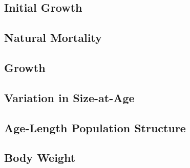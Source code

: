 \documentclass[11pt,
  english,
  letterpaper,
]{article}
\begin{document}
\hypertarget{initial-growth}{%
\subsection{Initial Growth}\label{initial-growth}}

\leavevmode\tagmcend\tagstructend


\hypertarget{natural-mortality}{%
\subsection{Natural Mortality}\label{natural-mortality}}

\leavevmode\tagmcend\tagstructend


\hypertarget{growth}{%
\subsection{Growth}\label{growth}}

\leavevmode\tagmcend\tagstructend


\hypertarget{variation-in-size-at-age}{%
\subsection{Variation in Size-at-Age}\label{variation-in-size-at-age}}

\leavevmode\tagmcend\tagstructend


\hypertarget{age-length-population-structure}{%
\subsection{Age-Length Population Structure}\label{age-length-population-structure}}

\leavevmode\tagmcend\tagstructend


\hypertarget{body-weight}{%
\subsection{Body Weight}\label{body-weight}}

\leavevmode\tagmcend\tagstructend
\end{document}
